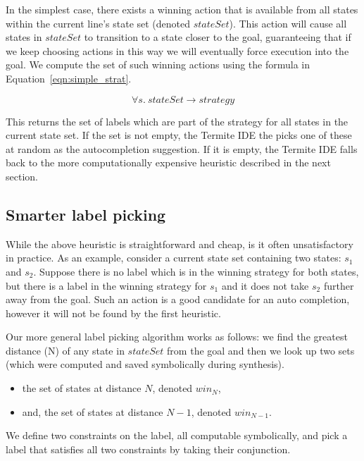 In the simplest case, there exists a winning action that is available from all states within the current line's state set (denoted $stateSet$). This action will cause all states in $stateSet$ to transition to a state closer to the goal, guaranteeing that if we keep choosing actions in this way we will eventually force execution into the goal. We compute the set of such winning actions using the formula in Equation~\ref{eqn:simple_strat}. 

\begin{equation}
\forall s. \: stateSet \rightarrow strategy
\label{eqn:simple_strat}
\end{equation}

This returns the set of labels which are part of the strategy for all states in the current state set. If the set is not empty, the Termite IDE the picks one of these at random as the autocompletion suggestion. If it is empty, the Termite IDE falls back to the more computationally expensive heuristic described in the next section.

\subsection{Smarter label picking}

While the above heuristic is straightforward and cheap, is it often unsatisfactory in practice. As an example, consider a current state set containing two states: $s_1$ and $s_2$. Suppose there is no label which is in the winning strategy for both states, but there is a label in the winning strategy for $s_1$ and it does not take $s_2$ further away from the goal. Such an action is a good candidate for an auto completion, however it will not be found by the first heuristic.

Our more general label picking algorithm works as follows: we find the greatest distance (N) of any state in $stateSet$ from the goal and then we look up two sets (which were computed and saved symbolically during synthesis).

\begin{itemize}
    \item the set of states at distance $N$, denoted $win_N$,
    \item and, the set of states at distance $N-1$, denoted $win_{N-1}$.
\end{itemize}

We define two constraints on the label, all computable symbolically, and pick a label that satisfies all two constraints by taking their conjunction.

